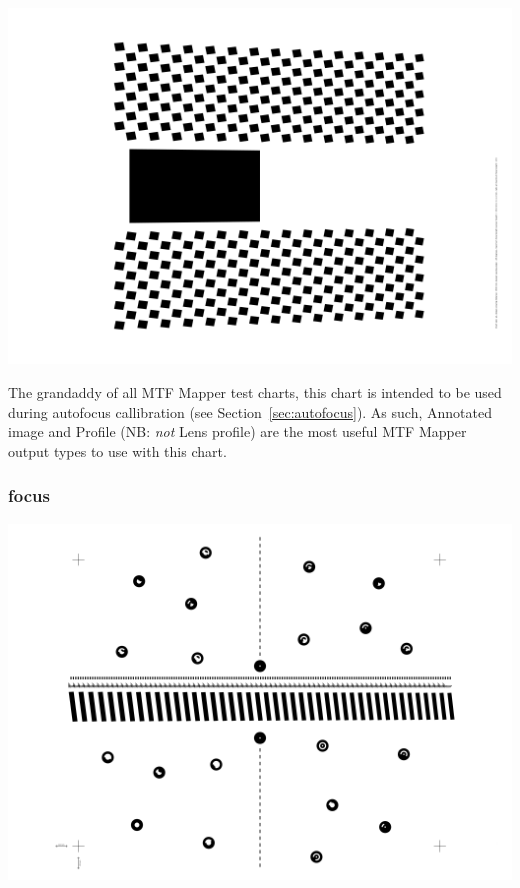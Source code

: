\documentclass[a4paper]{article}
\begin{document}
\parbox{\textwidth}{
\centering
\includegraphics[width=\textwidth]{figures/chart_perspective}
}
\vspace{1ex}

The grandaddy of all MTF Mapper test charts, this chart is intended to be
used during autofocus callibration (see Section~\ref{sec:autofocus}). As
such, \textsf{Annotated image} and \textsf{Profile} (NB: \emph{not}
\textsf{Lens profile}) are the most useful MTF Mapper output types to use
with this chart.

\subsubsection{focus}

\parbox{\textwidth}{
\centering
\includegraphics[width=\textwidth]{figures/chart_focus}
}
\vspace{1ex}
\end{document}
